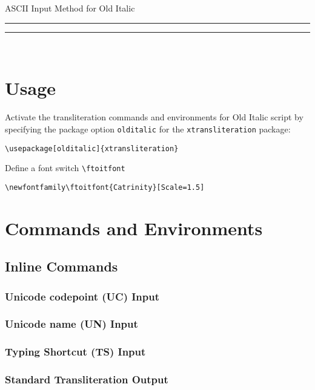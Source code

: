 \documentclass{article}
\newcommand\bqq[1]{\begin{quotation}#1\end{quotation}}
\begin{document}
\begin{center}
{\ttfamily\Large ASCII Input Method for Old Italic}

\rule{0.4\textwidth}{0.2pt}
\end{center}

\tableofcontents

\bigskip
\hfill\rule{0.4\textwidth}{0.2pt}\hfill\ 

\section{Usage}
Activate the transliteration commands and environments for Old Italic script by specifying the package option \texttt{olditalic} for the \texttt{xtransliteration} package:

\begin{center}
\verb|\usepackage[olditalic]{xtransliteration}|
\end{center}

Define a font switch \texttt{\textbackslash ftoitfont}

\begin{center}
\verb|\newfontfamily\ftoitfont{Catrinity}[Scale=1.5]|
\end{center}

\section{Commands and Environments}

\subsection{Inline Commands}
\subsubsection{Unicode codepoint (UC) Input}
\bqq{}

\subsubsection{Unicode name (UN) Input}
\bqq{}

\subsubsection{Typing Shortcut (TS) Input}
\bqq{}

\subsubsection{Standard Transliteration Output}
\bqq{}
\end{document}
